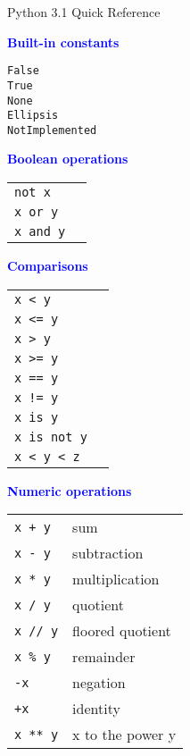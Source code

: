 \documentclass{article}
\newcommand{\header}[1]{
  {\large \textcolor{blue}{\textbf{#1}}}
}
\begin{document}
{\Huge Python 3.1 Quick Reference}

\hrulefill

\begin{multicols}{4}

\header{Built-in constants}

\texttt{False}\\
\texttt{True}\\
\texttt{None}\\
\texttt{Ellipsis}\\
\texttt{NotImplemented}

\header{Boolean operations}

\begin{tabular}{ll}
\texttt{not x}      & \\ 
\texttt{x or y}     & \\ 
\texttt{x and y}    & \\ 
\end{tabular}

\header{Comparisons}

\begin{tabular}{ll}
\texttt{x < y}  & \\ 
\texttt{x <= y} & \\ 
\texttt{x > y}  & \\ 
\texttt{x >= y} & \\ 
\texttt{x == y} & \\ 
\texttt{x != y} & \\ 
\texttt{x is y} & \\ 
\texttt{x is not y} & \\ 
\texttt{x < y < z}  & \\ 
\end{tabular}

\header{Numeric operations}

\begin{tabular}{ll}
\texttt{x + y}   & sum \\
\texttt{x - y}   & subtraction \\
\texttt{x * y}   & multiplication \\
\texttt{x / y}   & quotient \\
\texttt{x // y}  & floored quotient \\
\texttt{x \% y}  & remainder \\
\texttt{-x}      & negation \\
\texttt{+x}      & identity \\
\texttt{x ** y}  & x to the power y \\
\end{tabular}


\end{multicols}
\end{document}
